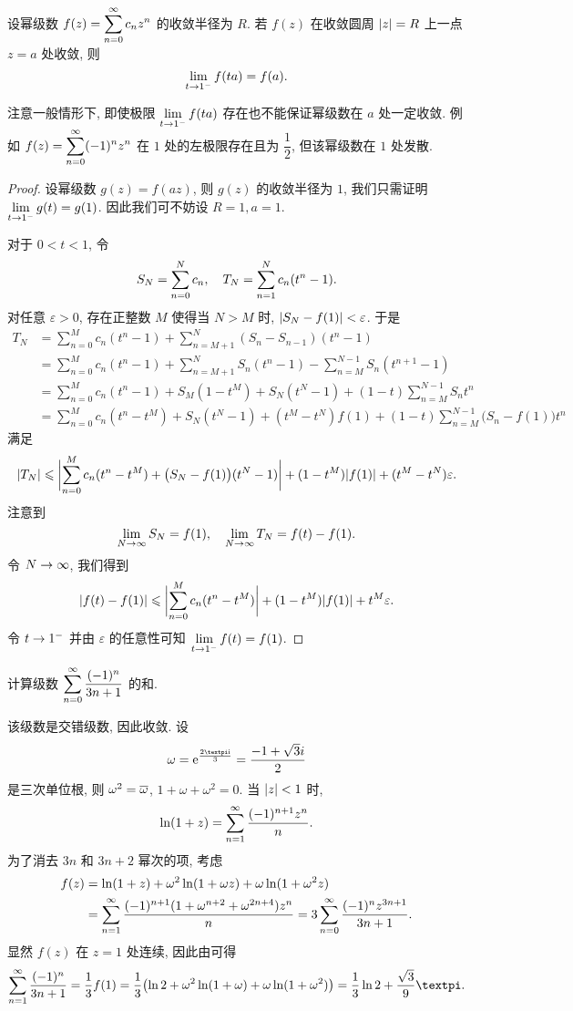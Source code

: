 \begin{theorem}[阿贝尔第二定理]
  \label{thm:abel-second}
  设幂级数 $f(z)=\displaystyle\sum_{n=0}^{\infty} c_nz^n$ 的收敛半径为 $R$.
  若 $f(z)$ 在收敛圆周 $\lvert z\rvert=R$ 上一点 $z=a$ 处收敛, 则
  \[
    \lim_{t\rightarrow 1^-}f(ta)=f(a).
  \]
\end{theorem}

注意一般情形下, 即使极限 $\lim\limits_{t\rightarrow 1^-}f(ta)$ 存在也不能保证幂级数在 $a$ 处一定收敛.
例如 $f(z)=\displaystyle\sum_{n=0}^{\infty} (-1)^nz^n$ 在 $1$ 处的左极限存在且为 $\dfrac12$, 但该幂级数在 $1$ 处发散.

\begin{proof}
  设幂级数 $g(z)=f(az)$, 则 $g(z)$ 的收敛半径为 $1$, 我们只需证明 $\lim\limits_{t\rightarrow 1^-} g(t)=g(1)$.
  因此我们可不妨设 $R=1,a=1$.

  对于 $0<t<1$, 令
  \[
    S_N=\sum\limits_{n=0}^N c_n,\quad 
    T_N=\sum\limits_{n=1}^N c_n(t^n-1).
  \]
  对任意 $\varepsilon>0$, 存在正整数 $M$ 使得当 $N>M$ 时, $\lvert S_N-f(1)\rvert<\varepsilon$.
  于是
  \begin{align*}
     T_N&
    =\sum_{n=0}^M c_n(t^n-1)+\sum_{n=M+1}^N(S_n-S_{n-1})(t^n-1)\\&
    =\sum_{n=0}^M c_n(t^n-1)+\sum_{n=M+1}^NS_n(t^n-1)-\sum_{n=M}^{N-1}S_n(t^{n+1}-1)\\&
    =\sum_{n=0}^M c_n(t^n-1)+S_M(1-t^M)+S_N(t^N-1)+(1-t)\sum_{n=M}^{N-1}S_nt^n\\&
    =\sum_{n=0}^M c_n(t^n-t^M)+S_N(t^N-1)+(t^M-t^N)f(1)+(1-t)\sum_{n=M}^{N-1}\bigl(S_n-f(1)\bigr)t^n
  \end{align*}
  满足
  \[
    \lvert T_N\rvert\leqslant \biggl\vert\sum_{n=0}^M c_n(t^n-t^M)+\bigl(S_N-f(1)\bigr)(t^N-1)\biggr\vert+(1-t^M)\lvert f(1)\rvert+(t^M-t^N)\varepsilon.
  \]
  注意到
  \[
    \lim\limits_{N\rightarrow\infty} S_N=f(1),\quad \lim\limits_{N\rightarrow\infty} T_N=f(t)-f(1).
  \]
  令 $N\rightarrow\infty$, 我们得到
  \[
    \lvert f(t)-f(1)\rvert\leqslant \biggl\vert\sum_{n=0}^M c_n(t^n-t^M)\biggr\vert+(1-t^M)\lvert f(1)\rvert+t^M \varepsilon.
  \]
  令 $t\rightarrow1^-$ 并由 $\varepsilon$ 的任意性可知 $\lim\limits_{t\rightarrow 1^-}f(t)=f(1)$.
\end{proof}

\begin{example}
  计算级数 $\displaystyle\sum_{n=0}^{\infty} \dfrac{(-1)^n}{3n+1}$ 的和.
\end{example}

\begin{solution}
  该级数是交错级数, 因此收敛.
  设
  \[
    \omega=\ee^{\frac{2\cpi\ii}3}=\frac{-1+\sqrt 3i}2
  \]
  是三次单位根, 则 $\omega^2=\overline\omega$, $1+\omega+\omega^2=0$.
  当 $\lvert z\rvert<1$ 时,
  \[
    \ln(1+z)=\displaystyle\sum_{n=1}^{\infty} \frac{(-1)^{n+1}z^n}{n}.
  \]
  为了消去 $3n$ 和 $3n+2$ 幂次的项, 考虑
  \begin{align*}
    f(z)&=\ln(1+z)+\omega^2\ln(1+\omega z)+\omega\ln(1+\omega^2 z)\\
    &=\displaystyle\sum_{n=1}^{\infty} \frac{(-1)^{n+1}(1+\omega^{n+2}+\omega^{2n+4})z^n}{n}
    =3\displaystyle\sum_{n=0}^{\infty} \frac{(-1)^n z^{3n+1}}{3n+1}.
  \end{align*}
  显然 $f(z)$ 在 $z=1$ 处连续, 因此由\thmAS 可得
  \[
     \sumf1 \dfrac{(-1)^n}{3n+1}
    =\frac13 f(1)
    =\frac13\bigl(\ln2+\omega^2\ln(1+\omega)+\omega\ln(1+\omega^2)\bigr)
    =\frac13\ln2+\frac{\sqrt3}9\cpi.
  \]
\end{solution}


